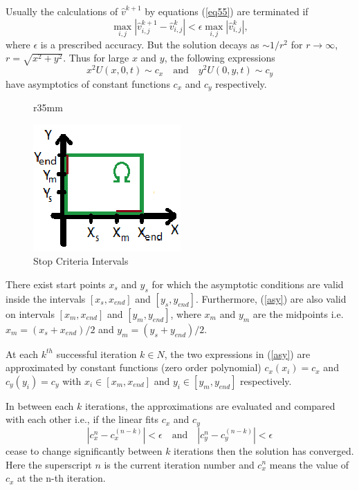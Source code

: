 \documentclass{article}
\newcommand{\rf}[1]{(\ref{#1})}
\begin{document}
Usually  the calculations of  $\widehat{v}^{k+1} $ by equations \rf{eq55} are  terminated if
\begin{equation*}
\max_{i,j} |\widehat{v}^{k+1}_{i,j}-\widehat{v}^{k}_{i,j}| < \epsilon \max_{i,j} |\widehat{v}^{k}_{i,j}| ,
\end{equation*}
where $\epsilon $ is a prescribed accuracy.  But the solution decays as $\sim1/{r}^{2}$ for $r \rightarrow \infty$, $r = \sqrt{{x}^{2} + {y}^{2}}$. Thus for large $x$ and $y$, the following expressions 
\begin{equation}\label{asy}
x^{2}U(x,0,t) \sim c_{x} \quad \textrm{and} \quad   y^{2}U(0,y,t) \sim c_{y}
\end{equation}
have asymptotics of constant functions  $c_{x}$ and $c_{y}$ respectively.
\begin{figure}{r}{35mm}
     \begin{center}
     \includegraphics[scale=1.2]{../EllipticEquationSJC/StopCrit.eps}
     \end{center}
	\caption{Stop Criteria Intervals}
	\label{fig:StopCritf}
\end{figure}
There exist start points $x_{s}$ and $y_{s}$ for which the asymptotic conditions
are valid inside the intervals $[x_{s}, x_{end}]$ and $[y_{s}, y_{end}]$. Furthermore, (\ref{asy}) are also valid on intervals $[x_{m}, x_{end}]$ and $[y_{m}, y_{end}]$, where $x_{m}$ and $y_{m}$ are the midpoints i.e.
$x_{m} = (x_{s} + x_{end})/2$ and $y_{m} = (y_{s} + y_{end})/2$. 


At each $k^{th}$ successful iteration $k \in N$, the two expressions in \rf{asy} are approximated by constant functions (zero order polynomial) $c_{x}(x_{i}) = c_{x}$ and $c_{y}(y_{i}) = c_{y}$ with $x_{i} \in [x_{m}, x_{end}]$ and $y_{i} \in [y_{m}, y_{end}]$ respectively.

In between each $k$ iterations, the approximations are evaluated and compared with each other i.e., if the linear fits $c_{x}$ and $c_{y}$
\begin{equation}\label{stopCrit}
|c_{x}^{n} - c_{x}^{(n-k)}| < \epsilon \quad \textrm{and} \quad |c_{y}^{n} - c_{y}^{(n-k)}| < \epsilon
\end{equation}
cease to change significantly between $k$ iterations then the solution has converged. Here the superscript $n$ is the current iteration number and $c_{x}^{n}$ means the value of $c_{x}$ at the n-th iteration.
\end{document}

